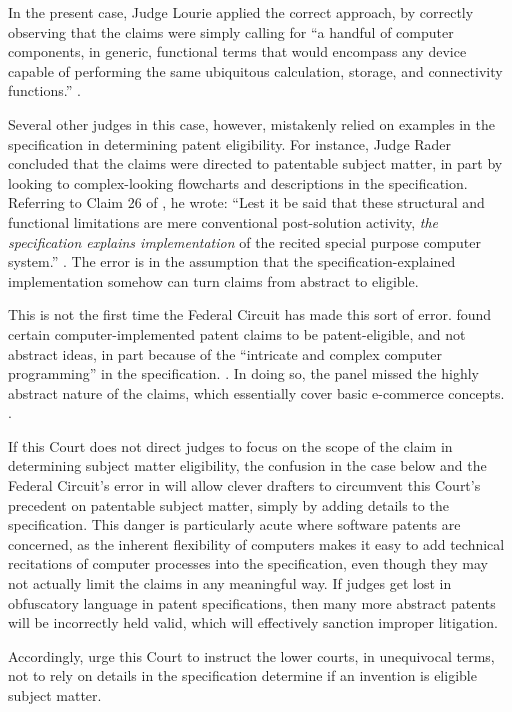 \documentclass{scotus}
\begin{document}
In the present case, Judge Lourie applied the correct approach, by
correctly observing that the claims were simply calling for ``a handful of
computer components, in generic, functional terms that would encompass any
device capable of performing the same ubiquitous calculation, storage, and
connectivity functions.'' .

Several other judges in this case, however, mistakenly relied on examples in the
specification in determining patent eligibility.
For instance, Judge Rader concluded that the claims
were directed to patentable subject matter, in part by looking to
complex-looking flowcharts and descriptions in the specification. Referring to
Claim 26 of , he wrote: ``Lest it be
said that these structural and functional limitations are
mere conventional post-solution activity, \emph{the specification explains
implementation} of the recited special purpose computer system.''
. The error is in the assumption
that the specification-explained implementation somehow can turn claims from
abstract to eligible.

This is not the first time the Federal Circuit has made this sort of error.
 found certain
computer-implemented patent claims to be patent-eligible, and not abstract
ideas, in part because of the ``intricate and complex computer programming''
in the specification. . In doing so, the panel missed the
highly abstract nature of the claims, which essentially cover basic e-commerce
concepts. .

If this Court does not direct judges to focus on the scope of the
claim in determining subject matter eligibility, the confusion in the case below
and the Federal Circuit's error in  will allow clever
drafters to circumvent this Court's precedent on patentable subject matter,
simply by adding details to the specification. This danger is particularly acute
where software patents are concerned, as the inherent flexibility of computers
makes it easy to add technical recitations of computer processes into the
specification, even though they may not actually limit the claims in any
meaningful way.  If judges get lost in obfuscatory language in patent
specifications, then many more abstract patents will be incorrectly held valid,
which will effectively sanction improper litigation.

Accordingly, \amici urge this Court to instruct the lower courts, in unequivocal
terms, not to rely on details in the specification determine if an
invention is eligible subject matter.
\end{document}
